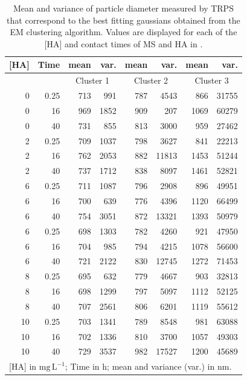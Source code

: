 \documentclass[journal=langd5,manuscript=article]{achemso}
\begin{document}
\begin{table}
\label{tbl:sizes}
\caption{Mean and variance of particle diameter measured by TRPS that correspond to the best fitting gaussians obtained from the EM clustering algorithm. Values are displayed for each of the [HA] and contact times of MS and HA in .}
\begin{tabular}{r r rr rr rr}
[HA] &Time &
mean  & var.  &
mean  & var.  &
mean  & var.  \\
\hline
& & \multicolumn{2}{c}{Cluster 1}&
\multicolumn{2}{c}{Cluster 2}&
\multicolumn{2}{c}{Cluster 3} \\
\hline  
 0 & 0.25 & 713 & 991 & 787 & 4543 & 866 & 31755 \\ 
 0 & 16 & 969 & 1852 & 909 & 207 & 1069 & 60279 \\ 
 0 & 40 & 731 & 855 & 813 & 3000 & 959 & 27462 \\ 
 2 & 0.25 & 709 & 1037 & 798 & 3627 & 841 & 22213 \\ 
 2 & 16 & 762 & 2053 & 882 & 11813 & 1453 & 51244 \\ 
 2 & 40 & 737 & 1712 & 838 & 8097 & 1461& 52821 \\ 
 6 & 0.25 & 711 & 1087 & 796 & 2908 & 896 & 49951 \\ 
 6 & 16 & 700 & 639 & 776 & 4396 & 1120 & 66499 \\ 
 6 & 40 & 754 & 3051 & 872 & 13321 & 1393 & 50979 \\ 
 6 & 0.25 & 698 & 1303 & 782 & 4260 & 921 & 47950 \\ 
 6 & 16 & 704 & 985 & 794 & 4215 & 1078 & 56600 \\ 
 6 & 40 & 721 & 2122 & 830 & 12745 & 1272 & 71453 \\ 
 8 & 0.25 & 695 & 632 & 779 & 4667 & 903 & 32813 \\ 
 8 & 16 & 698 & 1299 & 797 & 5097 & 1112 & 52125 \\ 
 8 & 40 & 707 & 2561 & 806 & 6201 & 1119 & 55612 \\ 
 10 & 0.25 & 703 & 1341 & 789 & 8548 & 981 & 63088 \\ 
 10 & 16 & 702 & 1336 & 810 & 3700 & 1057 & 49303 \\ 
 10 & 40 & 729 & 3537 & 982 & 17527 & 1200 & 45689 \\ 
\hline
\multicolumn{8}{l}{[HA] in $\mathrm{mg\,L^{-1}}$; Time in $\mathrm{h}$; mean and variance (var.) in $\mathrm{nm}$.} 
\end{tabular}
\end{table}


\end{document}

